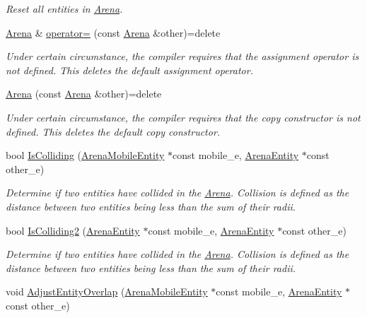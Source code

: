 \begin{DoxyCompactItemize}
\begin{DoxyCompactList}\small\item\em Reset all entities in \hyperlink{classArena}{Arena}. \end{DoxyCompactList}\item 
\hyperlink{classArena}{Arena} \& \hyperlink{classArena_aa977a50aa4a5570a2a553705f1909e9b}{operator=} (const \hyperlink{classArena}{Arena} \&other)=delete\hypertarget{classArena_aa977a50aa4a5570a2a553705f1909e9b}{}\label{classArena_aa977a50aa4a5570a2a553705f1909e9b}

\begin{DoxyCompactList}\small\item\em Under certain circumstance, the compiler requires that the assignment operator is not defined. This {\ttfamily deletes} the default assignment operator. \end{DoxyCompactList}\item 
\hyperlink{classArena_afce6e35e1470823539dc9194bef77499}{Arena} (const \hyperlink{classArena}{Arena} \&other)=delete\hypertarget{classArena_afce6e35e1470823539dc9194bef77499}{}\label{classArena_afce6e35e1470823539dc9194bef77499}

\begin{DoxyCompactList}\small\item\em Under certain circumstance, the compiler requires that the copy constructor is not defined. This {\ttfamily deletes} the default copy constructor. \end{DoxyCompactList}\item 
bool \hyperlink{classArena_ab4479b0268867602d0c4b510d5f99aff}{Is\+Colliding} (\hyperlink{classArenaMobileEntity}{Arena\+Mobile\+Entity} $\ast$const mobile\+\_\+e, \hyperlink{classArenaEntity}{Arena\+Entity} $\ast$const other\+\_\+e)
\begin{DoxyCompactList}\small\item\em Determine if two entities have collided in the \hyperlink{classArena}{Arena}. Collision is defined as the distance between two entities being less than the sum of their radii. \end{DoxyCompactList}\item 
bool \hyperlink{classArena_aaaa5f7724c89d67b74d123585900b5cf}{Is\+Colliding2} (\hyperlink{classArenaEntity}{Arena\+Entity} $\ast$const mobile\+\_\+e, \hyperlink{classArenaEntity}{Arena\+Entity} $\ast$const other\+\_\+e)
\begin{DoxyCompactList}\small\item\em Determine if two entities have collided in the \hyperlink{classArena}{Arena}. Collision is defined as the distance between two entities being less than the sum of their radii. \end{DoxyCompactList}\item 
void \hyperlink{classArena_a2506fab770b6070d8f061bcab4c65138}{Adjust\+Entity\+Overlap} (\hyperlink{classArenaMobileEntity}{Arena\+Mobile\+Entity} $\ast$const mobile\+\_\+e, \hyperlink{classArenaEntity}{Arena\+Entity} $\ast$const other\+\_\+e)\hypertarget{classArena_a2506fab770b6070d8f061bcab4c65138}{}\label{classArena_a2506fab770b6070d8f061bcab4c65138}


\end{DoxyCompactItemize}
